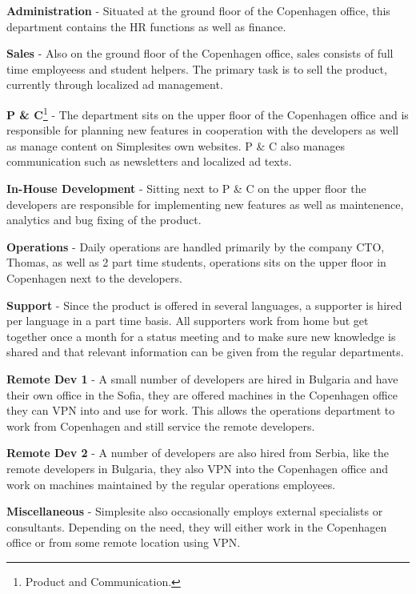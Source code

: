 \begin{itemize*}
    \item \textbf{Administration} - Situated at the ground floor of the
          Copenhagen office, this department contains the HR functions as well
          as finance.

    \item \textbf{Sales} - Also on the ground floor of the Copenhagen office,
          sales consists of full time employeess and student helpers. The
          primary task is to sell the product, currently through localized ad
          management.

    \item \textbf{P \& C}\footnote{Product and Communication.} - The department
          sits on the upper floor of the Copenhagen office and is responsible
          for planning new features in cooperation with the developers as well
          as manage content on Simplesites own websites. P \& C also manages
          communication such as newsletters and localized ad texts.

    \item \textbf{In-House Development} - Sitting next to P \& C on the upper
          floor the developers are responsible for implementing new features as
          well as maintenence, analytics and bug fixing of the product.

    \item \textbf{Operations} - Daily operations are handled primarily by the
          company CTO, Thomas, as well as 2 part time students, operations sits
          on the upper floor in Copenhagen next to the developers.

    \item \textbf{Support} - Since the product is offered in several languages,
          a supporter is hired per language in a part time basis. All supporters
          work from home but get together once a month for a status meeting and
          to make sure new knowledge is shared and that relevant information can
          be given from the regular departments.

    \item \textbf{Remote Dev 1} - A small number of developers are hired in
          Bulgaria and have their own office in the Sofia, they are offered
          machines in the Copenhagen office they can VPN into and use for work.
          This allows the operations department to work from Copenhagen and
          still service the remote developers.

    \item \textbf{Remote Dev 2} - A number of developers are also hired from
          Serbia, like the remote developers in Bulgaria, they also VPN into the
          Copenhagen office and work on machines maintained by the regular
          operations employees.

    \item \textbf{Miscellaneous} - Simplesite also occasionally employs external
          specialists or consultants. Depending on the need, they will either
          work in the Copenhagen office or from some remote location using VPN.
\end{itemize*}


